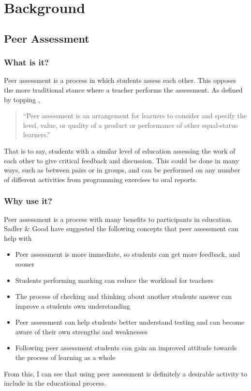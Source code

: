 \documentclass[a4paper,11pt]{report}
\begin{document}
\chapter{Background}
\section{Peer Assessment}
\subsection{What is it?}
Peer assessment is a process in which students assess each other. This opposes the more traditional stance where a teacher performs the assessment. As defined by topping \cite{topping_peer_2009},
\begin{quote}
``Peer assessment is an arrangement for learners to consider and specify the level, value, or quality of a product or performance of other equal-status learners.''
\end{quote}
That is to say, students with a similar level of education assessing the work of each other to give critical feedback and discussion. This could be done in many ways, such as between pairs or in groups, and can be performed on any number of different activities from programming exercises to oral reports.\par


\subsection{Why use it?}
Peer assessment is a process with many benefits to participants in education. Sadler \& Good \cite{sadler_impact_2006} have suggested the following concepts that peer assessment can help with
\begin{itemize}
 \item Peer assessment is more immediate, so students can get more feedback, and sooner
 \item Students performing marking can reduce the workload for teachers
 \item The process of checking and thinking about another students answer can improve a students own understanding \label{sec:peer-test-why}
 \item Peer assessment can help students better understand testing and can become aware of their own strengths and weaknesses
 \item Following peer assessment students can gain an improved attitude towards the process of learning as a whole
\end{itemize}
From this, I can see that using peer assessment is definitely a desirable activity to include in the educational process.\par
\end{document}
